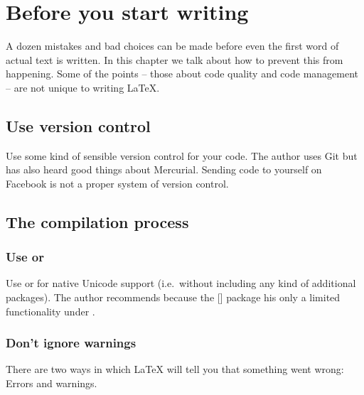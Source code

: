\chapter{Before you start writing}

A dozen mistakes and bad choices can be made before even the first word of actual text is written.
In this chapter we talk about how to prevent this from happening.
Some of the points -- those about code quality and code management -- are not unique to writing {\LaTeX}.




\section{Use version control}

Use some kind of sensible version control for your code.
The author uses Git but has also heard good things about Mercurial.
Sending code to yourself on Facebook is not a proper system of version control.





\section{The compilation process}



\subsection{Use \texorpdfstring{\LuaLaTeX}{LuaLaTeX} or \texorpdfstring{\XeLaTeX}{XeLaTeX}}

Use {\LuaLaTeX} or {\XeLaTeX} for native Unicode support (i.e.\ without including any kind of additional packages).
The author recommends {\LuaLaTeX} because the [\packname] package his only a limited functionality under {\XeLaTeX}.



\subsection{Don’t ignore warnings}

There are two ways in which {\LaTeX} will tell you that something went wrong:
Errors and warnings.

